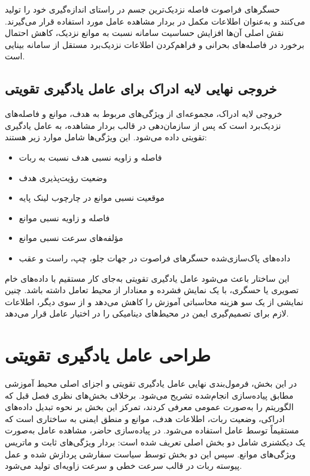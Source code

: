 حسگرهای فراصوت فاصله نزدیک‌ترین جسم در راستای اندازه‌گیری خود را تولید می‌کنند و به‌عنوان اطلاعات مکمل در بردار مشاهده عامل مورد استفاده قرار می‌گیرند. نقش اصلی آن‌ها افزایش حساسیت سامانه نسبت به موانع نزدیک، کاهش احتمال برخورد در فاصله‌های بحرانی و فراهم‌کردن اطلاعات نزدیک‌برد مستقل از سامانه بینایی است.

\subsection{خروجی نهایی لایه ادراک برای عامل یادگیری تقویتی}
\label{subsec:perception_output_rl}

خروجی لایه ادراک، مجموعه‌ای از ویژگی‌های مربوط به هدف، موانع و فاصله‌های نزدیک‌برد است که پس از سازمان‌دهی در قالب بردار مشاهده، به عامل یادگیری تقویتی داده می‌شود. این ویژگی‌ها شامل موارد زیر هستند:

\begin{itemize}
	\item فاصله و زاویه نسبی هدف نسبت به ربات
	\item وضعیت رؤیت‌پذیری هدف
	\item موقعیت نسبی موانع در چارچوب لینک پایه
	\item فاصله و زاویه نسبی موانع
	\item مؤلفه‌های سرعت نسبی موانع
	\item داده‌های پاک‌سازی‌شده حسگرهای فراصوت در جهات جلو، چپ، راست و عقب
\end{itemize}

این ساختار باعث می‌شود عامل یادگیری تقویتی به‌جای کار مستقیم با داده‌های خام تصویری یا حسگری، با یک نمایش فشرده و معنادار از محیط تعامل داشته باشد. چنین نمایشی از یک سو هزینه محاسباتی آموزش را کاهش می‌دهد و از سوی دیگر، اطلاعات لازم برای تصمیم‌گیری ایمن در محیط‌های دینامیکی را در اختیار عامل قرار می‌دهد.
\section{طراحی عامل یادگیری تقویتی}
\label{sec:rl_agent_design}

در این بخش، فرمول‌بندی نهایی عامل یادگیری تقویتی و اجزای اصلی محیط آموزشی مطابق پیاده‌سازی انجام‌شده تشریح می‌شود. برخلاف بخش‌های نظری فصل قبل که الگوریتم  را به‌صورت عمومی معرفی کردند، تمرکز این بخش بر نحوه تبدیل داده‌های ادراکی، وضعیت ربات، اطلاعات هدف، موانع و منطق ایمنی به ساختاری است که مستقیماً توسط عامل استفاده می‌شود. در پیاده‌سازی حاضر، مشاهده عامل به‌صورت یک دیکشنری شامل دو بخش اصلی تعریف شده است: بردار ویژگی‌های ثابت و ماتریس ویژگی‌های موانع. سپس این دو بخش توسط سیاست سفارشی  پردازش شده و عمل پیوسته ربات در قالب سرعت خطی و سرعت زاویه‌ای تولید می‌شود.

